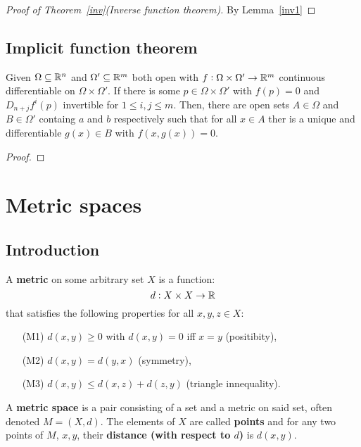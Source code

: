 \documentclass[../Year2.tex]{subfiles}
\begin{document}
\begin{proof}[Proof of Theorem~\ref{inv}(Inverse function theorem)]
    By Lemma~\ref{inv1} 
\end{proof}

\subsection{Implicit function theorem}

\begin{theorem}
    Given $\Omega\subseteq\mathbb{R}^n$ and $\Omega'\subseteq\mathbb{R}^m$ both open with $f:\Omega\times\Omega'\rightarrow\mathbb{R}^m$ continuous differentiable on $\Omega\times\Omega'$. If there is some $p\in\Omega\times\Omega'$ with $f(p)=0$ and $D_{n+j}f^i(p)$ invertible for $1\leq i, j\leq m$. Then, there are open sets $A\in\Omega$ and $B\in\Omega'$ containg $a$ and $b$ respectively such that for all $x\in A$ ther is a unique and differentiable $g(x)\in B$ with $f(x,g(x))=0$.
    \begin{proof}
        
    \end{proof}
\end{theorem}

\section{Metric spaces}

\subsection{Introduction}

\begin{definition}[Metric]
    A \textbf{metric} on some arbitrary set $X$ is a function: \[
        d:X\times X\rightarrow\mathbb{R}
    \] that satisfies the following properties for all $x,y,z\in X$: \begin{enumerate}
        \item[(M1)] $d(x,y)\geq 0$ with $d(x,y)=0$ iff $x=y$ (positibity),
        \item[(M2)] $d(x,y)=d(y,x)$ (symmetry),
        \item[(M3)] $d(x,y) \leq d(x,z) + d(z,y)$ (triangle innequality).
    \end{enumerate}
\end{definition}

\begin{definition}
    A \textbf{metric space} is a pair consisting of a set and a metric on said set, often denoted $M=(X,d)$. The elements of $X$ are called \textbf{points} and for any two points of $M$, $x,y$, their \textbf{distance (with respect to $d$)} is $d(x,y)$.
\end{definition}
\end{document}
